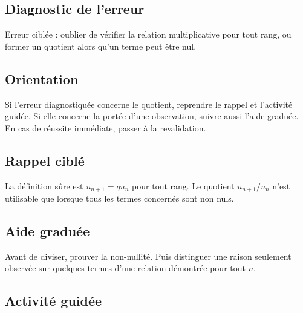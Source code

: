 

\subsection*{Diagnostic de l'erreur}
Erreur ciblée : oublier de vérifier la relation multiplicative pour tout rang,
ou former un quotient alors qu'un terme peut être nul.

\subsection*{Orientation}
Si l'erreur diagnostiquée concerne le quotient, reprendre le rappel et
l'activité guidée. Si elle concerne la portée d'une observation, suivre aussi
l'aide graduée. En cas de réussite immédiate, passer à la revalidation.

\subsection*{Rappel ciblé}
La définition sûre est $u_{n+1}=q u_n$ pour tout rang. Le quotient
$u_{n+1}/u_n$ n'est utilisable que lorsque tous les termes concernés sont non
nuls.

\subsection*{Aide graduée}
Avant de diviser, prouver la non-nullité. Puis distinguer une raison seulement
observée sur quelques termes d'une relation démontrée pour tout $n$.

\subsection*{Activité guidée}


